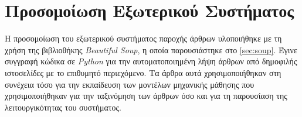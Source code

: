 \section{Προσομοίωση Εξωτερικού Συστήματος}
\label{sec:Simulation}
Η προσομοίωση του εξωτερικού συστήματος παροχής άρθρων υλοποιήθηκε με τη χρήση της βιβλιοθήκης \emph{Beautiful Soup}, η οποία παρουσιάστηκε στο \autoref{sec:soup}. Έγινε συγγραφή κώδικα σε \emph{Python} για την αυτοματοποιημένη λήψη άρθρων από δημοφιλής ιστοσελίδες με το επιθυμητό περιεχόμενο. Τα άρθρα αυτά χρησιμοποιήθηκαν στη συνέχεια τόσο για την εκπαίδευση των μοντέλων μηχανικής μάθησης που χρησιμοποιήθηκαν για την ταξινόμηση των άρθρων όσο και για τη παρουσίαση της λειτουργικότητας του συστήματος.